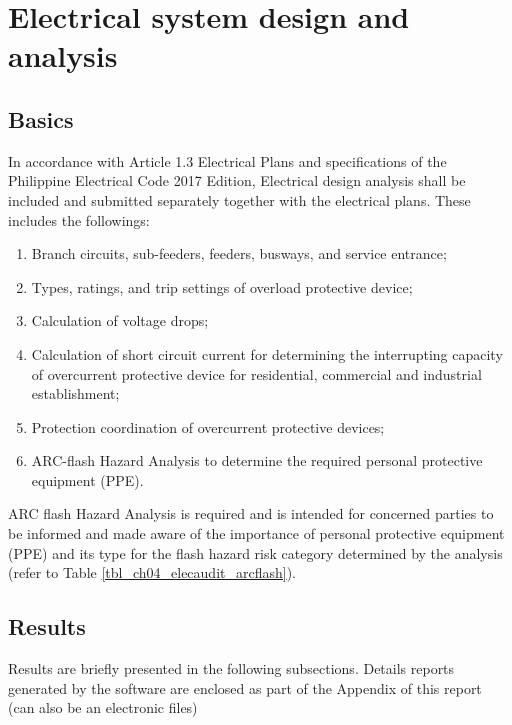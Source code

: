 \section{Electrical system design and analysis} \label{ch04_elecaudit_systemdesign}
\subsection{Basics}
In accordance with Article 1.3 Electrical Plans and specifications of the Philippine Electrical Code 2017 Edition, Electrical design analysis shall be included and submitted separately together with the electrical plans. These includes the followings:

\begin{enumerate}%
\item Branch circuits, sub-feeders, feeders, busways, and service entrance;
\item Types, ratings, and trip settings of overload protective device;
\item Calculation of voltage drops;
\item	Calculation of short circuit current for determining the interrupting capacity of overcurrent protective device for residential, commercial and industrial establishment;
\item	Protection coordination of overcurrent protective devices;
\item	ARC-flash Hazard Analysis to determine the required personal protective equipment (PPE).
\end{enumerate}

ARC flash Hazard Analysis is required and is intended for concerned parties to be informed and made aware of the importance of personal protective equipment (PPE) and its type for the flash hazard risk category determined by the analysis (refer to Table \ref{tbl_ch04_elecaudit_arcflash}).




\subsection{Results}
Results are briefly presented in the following subsections. Details reports generated by the software are enclosed as part of the Appendix of this report (can also be an electronic files)

%
